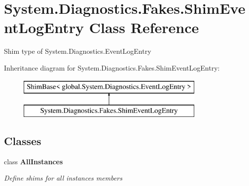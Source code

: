 \hypertarget{class_system_1_1_diagnostics_1_1_fakes_1_1_shim_event_log_entry}{\section{System.\-Diagnostics.\-Fakes.\-Shim\-Event\-Log\-Entry Class Reference}
\label{class_system_1_1_diagnostics_1_1_fakes_1_1_shim_event_log_entry}
}


Shim type of System.\-Diagnostics.\-Event\-Log\-Entry 


Inheritance diagram for System.\-Diagnostics.\-Fakes.\-Shim\-Event\-Log\-Entry\-:\begin{figure}[H]
\begin{center}
\leavevmode
\includegraphics[height=2.000000cm]{class_system_1_1_diagnostics_1_1_fakes_1_1_shim_event_log_entry}
\end{center}
\end{figure}
\subsection*{Classes}
\begin{DoxyCompactItemize}
\item 
class {\bfseries All\-Instances}
\begin{DoxyCompactList}\small\item\em Define shims for all instances members\end{DoxyCompactList}\end{DoxyCompactItemize}
